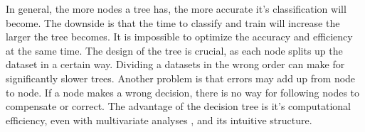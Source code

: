 In general, the more nodes a tree has, the more accurate it's classification will become. The downside is that the time to classify and train will increase the larger the tree becomes. It is impossible to optimize the accuracy and efficiency at the same time. The design of the tree is crucial, as each node splits up the dataset in a certain way. Dividing a datasets in the wrong order can make for significantly slower trees. Another problem is that errors may add up from node to node. If a node makes a wrong decision, there is no way for following nodes to compensate or correct. The advantage of the decision tree is it's computational efficiency, even with multivariate analyses \cite{safavian1991survey}, and its intuitive structure.